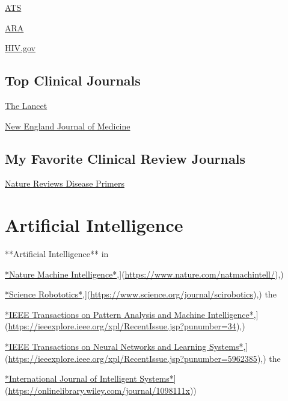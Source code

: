 \documentclass[
]{book}
\begin{document}
\href{https://www.thoracic.org/statements/index.php}{ATS}

\href{https://www.rheumatology.org/Practice-Quality/Clinical-Support/Clinical-Practice-Guidelines}{ARA}

\href{https://clinicalinfo.hiv.gov/en/guidelines}{HIV.gov}

\section{Top Clinical Journals}\label{top-clinical-journals}

\href{https://www.thelancet.com/}{The Lancet}

\href{https://www.nejm.org/}{New England Journal of Medicine}

\section{My Favorite Clinical Review Journals}\label{my-favorite-clinical-review-journals}

\href{https://www.nature.com/nrdp/}{Nature Reviews Disease Primers}

\chapter{Artificial Intelligence}\label{artificial-intelligence}

**Artificial Intelligence** in

\href{\%5Bhttps://www.nature.com/natmachintell/}{*Nature Machine Intelligence*},{]}(\url{https://www.nature.com/natmachintell/}),)

\href{\%5Bhttps://www.science.org/journal/scirobotics}{*Science Robototics*},{]}(\url{https://www.science.org/journal/scirobotics}),) the

\href{\%5Bhttps://ieeexplore.ieee.org/xpl/RecentIssue.jsp?punumber=34}{*IEEE Transactions on Pattern Analysis and Machine Intelligence*},{]}(\url{https://ieeexplore.ieee.org/xpl/RecentIssue.jsp?punumber=34}),)

\href{\%5Bhttps://ieeexplore.ieee.org/xpl/RecentIssue.jsp?punumber=5962385}{*IEEE Transactions on Neural Networks and Learning Systems*},{]}(\url{https://ieeexplore.ieee.org/xpl/RecentIssue.jsp?punumber=5962385}),) the

\href{\%5Bhttps://onlinelibrary.wiley.com/journal/1098111x}{*International Journal of Intelligent Systems*}{]}(\url{https://onlinelibrary.wiley.com/journal/1098111x}))
\end{document}
